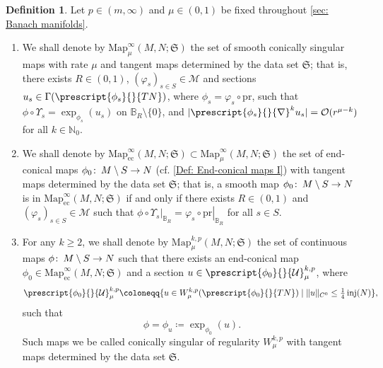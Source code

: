 \documentclass{article}
\numberwithin{equation}{section}        %
\theoremstyle{bfnote}
\theoremstyle{definition}
\newtheorem{Def}[thm]{Definition}           %
\theoremstyle{bfremark}
\newcommand{\col}{\colon \thinspace}        %
\newcommand{\N}{\mathbb{N}}                 %
\newcommand{\Ball}{\mathbb{B}}              %
\newcommand{\Map}{\mathrm{Map}}             %
\newcommand{\pr}{\mathrm{pr}}               %
\DeclareMathOperator{\inj}{inj}                 %
\begin{document}
\begin{Def}     \label{Def: manifold structure for Sobolev maps with variable tangent}
    Let $p \in (m,\infty)$ and $\mu \in (0,1)$ be fixed throughout \cref{sec: Banach manifolds}. 
    \begin{enumerate}
        \item We shall denote by $\Map^\infty_\mu(M,N;\mathfrak{S})$ the set of smooth conically singular maps with rate $\mu$ and tangent maps determined by the data set $\mathfrak{S}$; that is, there exists $R \in (0,1)$, $(\varphi_s)_{s \in S} \in \mathcal{M}$ and sections $u_s \in \Gamma(\prescript{\phi_s}{}{TN})$, where $\phi_s = \varphi_s \circ \pr$, such that $\phi \circ \Upsilon_s = \exp_{\phi_s}(u_s)$ on $\Ball_R \setminus \{0\}$, and $|\prescript{\phi_s}{}{\nabla}^k u_s| = \mathcal{O}(r^{\mu-k})$ for all $k \in \N_0$.

        \item We shall denote by $\Map^\infty_{\mathrm{ec}}(M,N;\mathfrak{S}) \subset \Map^\infty_\mu(M,N;\mathfrak{S})$ the set of end-conical maps $\phi_0 \col M \setminus S \to N$ (cf. \cref{Def: End-conical maps I}) with tangent maps determined by the data set $\mathfrak{S}$; that is, a smooth map $\phi_0 \col M \setminus S \to N$ is in $\Map^{\infty}_{\mathrm{ec}}(M,N;\mathfrak{S})$ if and only if there exists $R \in (0,1)$ and $(\varphi_s)_{s \in S} \in \mathcal{M}$ such that $\left. \phi \circ \Upsilon_s  \right|_{\Ball_R} = \left. \varphi_s \circ \pr \right|_{\Ball_R}$ for all $s \in S$.

        \item For any $k \geq 2$, we shall denote by $\Map^{k,p}_\mu(M,N;\mathfrak{S})$ the set of continuous maps $\phi \col M \setminus S \to N$ such that there exists an end-conical map $\phi_0 \in \Map^\infty_{\mathrm{ec}}(M,N;\mathfrak{S})$ and a section $u \in \prescript{\phi_0}{}{\mathcal{U}}^{k,p}_\mu$, where
        \begin{equation*}
            \prescript{\phi_0}{}{\mathcal{U}}^{k,p}_\mu \coloneqq \{ u \in W^{k,p}_\mu(\prescript{\phi_0}{}{TN}) \mid \|u\|_{C^0} \leq \tfrac{1}{4} \inj(N) \},
        \end{equation*}
        such that
        \begin{equation*}
            \phi = \phi_u \coloneqq \exp_{\phi_0}(u) .
        \end{equation*}
        Such maps we be called conically singular of regularity $W^{k,p}_\mu$ with tangent maps determined by the data set $\mathfrak{S}$.
    \end{enumerate}
\end{Def}
\end{document}
